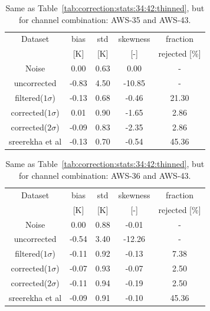 \documentclass[12pt]{article}
\begin{document}
\begin{table}[!p]
	\centering
	\begin{tabular}[b]{c|c|c|c|c}
		Dataset  		  &   bias &   std &   skewness & fraction \\
							&   [K]  &   [K] & [-] & rejected [\%]\\
		\hline
 Noise           	  &  0.00 &  0.63 &               0.00 &                -\\
uncorrected     	  &  -0.83 &  4.50 &             -10.85 &                - \\
filtered($1\sigma$)	  &  -0.13 &  0.68 &              -0.46 &               21.30 \\
corrected($1\sigma$)  &   0.01 &  0.90 &              -1.65 &                2.86 \\
corrected($2\sigma$)  &  -0.09 &  0.83 &              -2.35 &                2.86 \\
sreerekha et al  	  &  -0.13 &  0.70 &              -0.54 &               45.36 \\
		\hline
	\end{tabular}
	\caption{Same as Table~\ref{tab:correction:stats:34:42:thinned}, but for channel combination: AWS-35 and AWS-43.}
	\label{tab:correction:stats:35:43}
\end{table}

\begin{table}[!p]
	\centering
	\begin{tabular}[b]{c|c|c|c|c}
		Dataset  		  &   bias &   std &   skewness & fraction  \\
							&   [K]  &   [K] & [-] & rejected [\%]\\
		\hline
 Noise            	 &  0.00 &  0.88 &              -0.01 &               - \\
uncorrected      	 &  -0.54 &  3.40 &             -12.26 &                - \\
filtered($1\sigma$)  &  -0.11 &  0.92 &              -0.13 &                7.38 \\
corrected($1\sigma$) &  -0.07 &  0.93 &              -0.07 &                2.50 \\
corrected($2\sigma$) &  -0.11 &  0.94 &              -0.19 &                2.50 \\
sreerekha et al 	 &  -0.09 &  0.91 &              -0.10 &               45.36 \\
		\hline
	\end{tabular}
	\caption{Same as Table~\ref{tab:correction:stats:34:42:thinned}, but for channel combination: AWS-36 and AWS-43.   }
	\label{tab:correction:stats:36:43}
\end{table}
\end{document}

